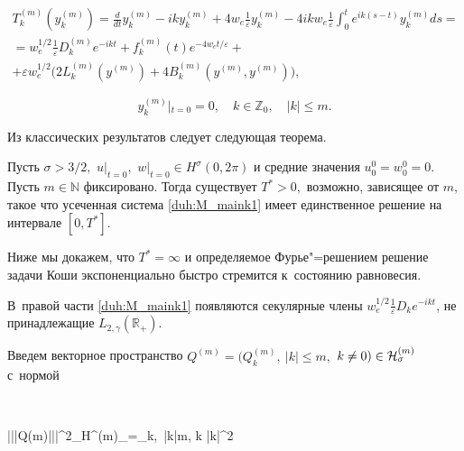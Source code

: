 \begin{multline}

T^{(m)}_k(y^{(m)}_k)=\frac{d}{dt}y^{(m)}_k-iky^{(m)}_k+4w_e\frac1\varepsilon y^{(m)}_k-4ikw_e\frac1\varepsilon \int_0^t e^{ik(s-t)}y^{(m)}_kds=

\\

=w_e^{1/2}\frac1\varepsilon D^{(m)}_k e^{-ikt}+f^{(m)}_k(t) e^{-4w_e t/\varepsilon } +

\\

+\varepsilon w_e^{1/2}\bigl( 2L^{(m)}_k(y^{(m)})+4B^{(m)}_k(y^{(m)},y^{(m)})\bigr),

\label{duh:M_maink1}

\end{multline}

$$

y^{(m)}_k|_{t=0}=0,\quad k\in \mathbb Z_0,\quad |k|\le m.

$$



Из классических результатов следует следующая теорема.



\smallskip



\begin{theorem}[2]\label{duh:T_Inter1}Пусть $\sigma> 3/2,$ $u|_{t=0},$ $w|_{t=0}\in H^\sigma(0,2\pi)$ и средние значения $u_0^0=w_0^0=0.$ Пусть $m\in \mathbb N$ фиксировано. Тогда существует $T^*>0,$ воз\-мож\-но{\rm,} зависящее от $m,$ такое что усеченная система \eqref{duh:M_maink1} имеет единственное решение на интервале $[0,T^*].$ 

\end{theorem}



\smallskip



Ниже мы докажем, что $T^*=\infty$ и определяемое Фурье"=решением решение задачи Коши экспоненциально быстро стремится к~состоянию равновесия. 

В~правой части \eqref{duh:M_maink1} появляются секулярные члены $w_e^{1/2}\frac1\varepsilon D_ke^{-ikt}$, не принадлежащие $L_{2,\gamma}(\mathbb R_{+})$.  

Введем векторное пространство  $Q^{(m)}=(Q^{(m)}_k,~ |k|\le m,$ $ k\ne0)\in{\cal H}^{(m)}_\sigma$ с~нормой 

$$

|||Q{(m)}|||^2_{{\cal H}^{(m)}_\sigma}=\sum_{k,~|k|\le m, k} |k|^{2\sigma}

